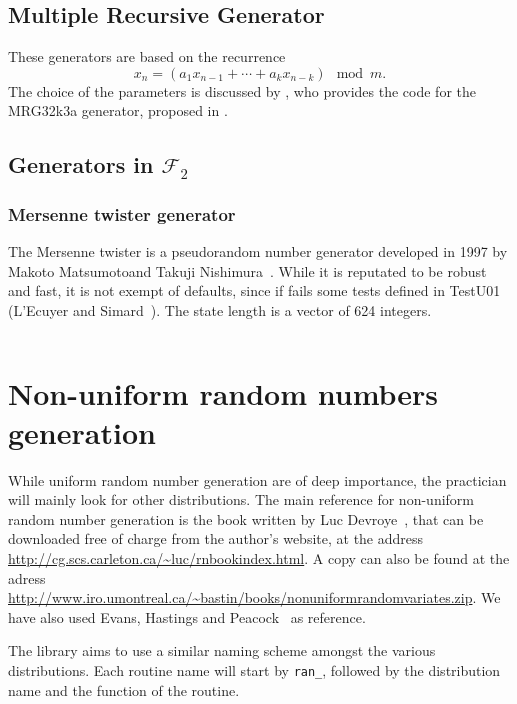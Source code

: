 \subsection{Multiple Recursive Generator}

These generators are based on the recurrence
\[
  {x_n} = (a_1 x_{n-1} + \cdots + a_k x_{n-k}) \mod {m}.
\]
The choice of the parameters is discussed by \citep{LEcu99}, who provides the code for the MRG32k3a generator, proposed in \oratio{}.

\subsection{Generators in $\mathcal{F}_2$}

\subsubsection{Mersenne twister generator}

The Mersenne twister is a pseudorandom number generator developed in
1997 by Makoto Matsumotoand Takuji Nishimura~\cite{MatsNish98}.
While it is reputated to be robust and fast, it is not exempt of defaults,
since if fails some tests defined in TestU01 (L'Ecuyer and
Simard~\cite{LEcuSima07}).
The state length is a vector of 624 integers.

\begin{verbatim}
\end{verbatim}

\section{Non-uniform random numbers generation}

While uniform random number generation are of deep importance, the
practician will mainly look for other distributions.
The main reference for non-uniform random number generation is the
book written by Luc Devroye~\cite{Devr86}, that can be
downloaded free of charge from the author's website, at the address
\url{http://cg.scs.carleton.ca/~luc/rnbookindex.html}.
A copy can also be found at the adress
\url{http://www.iro.umontreal.ca/~bastin/books/nonuniformrandomvariates.zip}.
We have also used Evans, Hastings and Peacock~\cite{EvanHastPeac93} as
reference.

The library aims to use a similar naming scheme amongst the various
distributions.
Each routine name will start by \verb|ran_|, followed by the
distribution name and the function of the routine.

